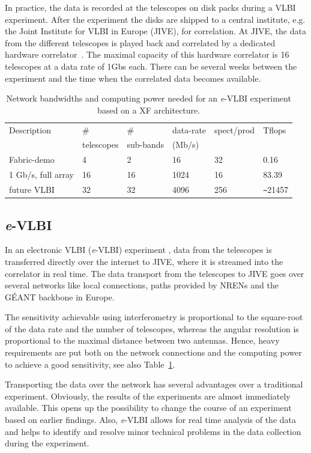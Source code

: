 \documentclass[12pt]{article}
\begin{document}
In practice, the data is recorded at the telescopes on disk packs
during a VLBI experiment. After the experiment the disks are shipped
to a central institute, e.g. the Joint Institute for VLBI in Europe
(JIVE), for correlation. At JIVE, the data from the different
telescopes is played back and correlated by a dedicated hardware
correlator~\cite{EVNCorrelator}. The maximal capacity of this hardware
correlator is 16 telescopes at a data rate of 1Gbs each. There can be
several weeks between the experiment and the time when the correlated
data becomes available.

\begin{table}
  \centering
  \begin{tabular}[c]{|l|l|l|l|l|l|}
    \hline
    Description & \# & \#  & data-rate & spect/prod & Tflops\\
    & telescopes & sub-bands & (Mb/s) &  & \\
    \hline
    \hline
    Fabric-demo &4 &2 &16 &32 &0.16\\
    1 Gb/s, full array  &16 &16 &1024 &16 &83.39\\
    future VLBI &32 &32 &4096 &256 &\verb|~|21457\\
    \hline
  \end{tabular}
  \caption{Network bandwidths and computing power needed for an {\it e}-VLBI
    experiment based on a XF architecture.}
  \label{tab:speed}
\end{table}
\subsection{{\it e}-VLBI}
In an electronic VLBI ({\it e}-VLBI) experiment \cite{szomoru-2004},
data from the telescopes is transferred directly over the internet to
JIVE, where it is streamed into the correlator in real time. The data
transport from the telescopes to JIVE goes over several networks like
local connections, paths provided by NRENs and the G\'EANT backbone in
Europe.

The sensitivity achievable using interferometry is proportional to the
square-root of the data rate and the number of telescopes, whereas the
angular resolution is proportional to the maximal distance between two
antennas. Hence, heavy requirements are put both on the network
connections and the computing power to achieve a good sensitivity, see
also Table~\ref{tab:speed}.

Transporting the data over the network has several advantages over a
traditional experiment. Obviously, the results of the experiments are
almost immediately available. This opens up the possibility to change
the course of an experiment based on earlier findings. Also, {\it
  e}-VLBI allows for real time analysis of the data and helps to
identify and resolve minor technical problems in the data collection
during the experiment.
\end{document}
